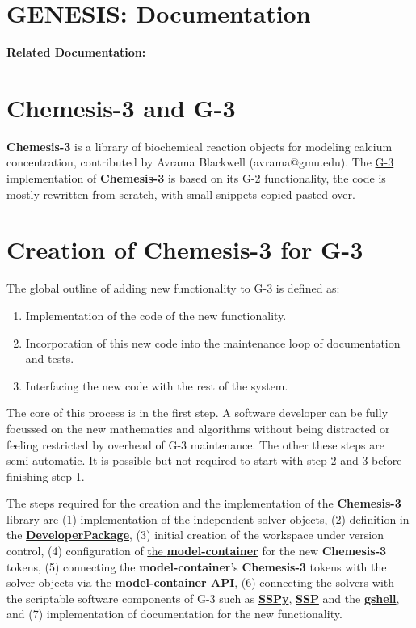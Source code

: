\documentclass[12pt]{article}
\begin{document}
\section*{GENESIS: Documentation}

{\bf Related Documentation:}

\section*{Chemesis-3 and G-3}

{\bf Chemesis-3} is a library of biochemical reaction objects for
modeling calcium
concentration\cite{blackwell02:_neuros_datab_pract_guide}, contributed
by Avrama Blackwell (avrama@gmu.edu).  The
\href{../genesis-overview/genesis-overview.tex}{G-3} implementation of
{\bf Chemesis-3} is based on its G-2 functionality, the code is mostly
rewritten from scratch, with small snippets copied pasted over.

\section*{Creation of {\bf Chemesis-3} for G-3}

The global outline of adding new functionality to G-3 is defined as:
\begin{enumerate}
\item Implementation of the code of the new functionality.
\item Incorporation of this new code into the maintenance loop of
  documentation and tests.
\item Interfacing the new code with the rest of the system.
\end{enumerate}

The core of this process is in the first step.  A software developer
can be fully focussed on the new mathematics and algorithms without
being distracted or feeling restricted by overhead of G-3 maintenance.
The other these steps are semi-automatic.  It is possible but not
required to start with step 2 and 3 before finishing step 1.

The steps required for the creation and the implementation of the {\bf
  Chemesis-3} library are (1) implementation of the independent solver
objects, (2) definition in the
\href{../developer-package/developer-package.tex}{\bf
  DeveloperPackage}, (3) initial creation of the workspace under
version control, (4) configuration of
\href{model-container/model-container.tex}{the {\bf model-container}}
for the new {\bf Chemesis-3} tokens, (5) connecting the {\bf
  model-container}'s {\bf Chemesis-3} tokens with the solver objects via
the {\bf model-container API}, (6) connecting the solvers with the
scriptable software components of G-3 such as
\href{../sspy/sspy.tex}{\bf SSPy}, \href{../ssp/ssp.tex}{\bf SSP} and
the \href{../gshell/gshell.tex}{\bf gshell}, and (7) implementation of
documentation for the new functionality.
\end{document}
